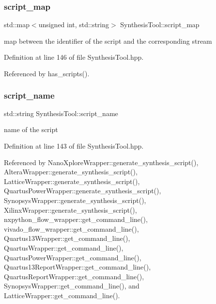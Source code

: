 \mbox{\label{classSynthesisTool_a0ce13155500ff964c4b5c44954ec0c70}} 
\subsubsection{\texorpdfstring{script\+\_\+map}{script\_map}}
{\footnotesize\ttfamily std\+::map$<$unsigned int, std\+::string$>$ Synthesis\+Tool\+::script\+\_\+map\hspace{0.3cm}{\ttfamily [protected]}}



map between the identifier of the script and the corresponding stream 



Definition at line 146 of file Synthesis\+Tool.\+hpp.



Referenced by has\+\_\+scripts().

\mbox{\label{classSynthesisTool_aea5cb1e9b66387f4f9a51e4adb2d5dc2}} 
\subsubsection{\texorpdfstring{script\+\_\+name}{script\_name}}
{\footnotesize\ttfamily std\+::string Synthesis\+Tool\+::script\+\_\+name\hspace{0.3cm}{\ttfamily [protected]}}



name of the script 



Definition at line 143 of file Synthesis\+Tool.\+hpp.



Referenced by Nano\+Xplore\+Wrapper\+::generate\+\_\+synthesis\+\_\+script(), Altera\+Wrapper\+::generate\+\_\+synthesis\+\_\+script(), Lattice\+Wrapper\+::generate\+\_\+synthesis\+\_\+script(), Quartus\+Power\+Wrapper\+::generate\+\_\+synthesis\+\_\+script(), Synopsys\+Wrapper\+::generate\+\_\+synthesis\+\_\+script(), Xilinx\+Wrapper\+::generate\+\_\+synthesis\+\_\+script(), nxpython\+\_\+flow\+\_\+wrapper\+::get\+\_\+command\+\_\+line(), vivado\+\_\+flow\+\_\+wrapper\+::get\+\_\+command\+\_\+line(), Quartus13\+Wrapper\+::get\+\_\+command\+\_\+line(), Quartus\+Wrapper\+::get\+\_\+command\+\_\+line(), Quartus\+Power\+Wrapper\+::get\+\_\+command\+\_\+line(), Quartus13\+Report\+Wrapper\+::get\+\_\+command\+\_\+line(), Quartus\+Report\+Wrapper\+::get\+\_\+command\+\_\+line(), Synopsys\+Wrapper\+::get\+\_\+command\+\_\+line(), and Lattice\+Wrapper\+::get\+\_\+command\+\_\+line().

